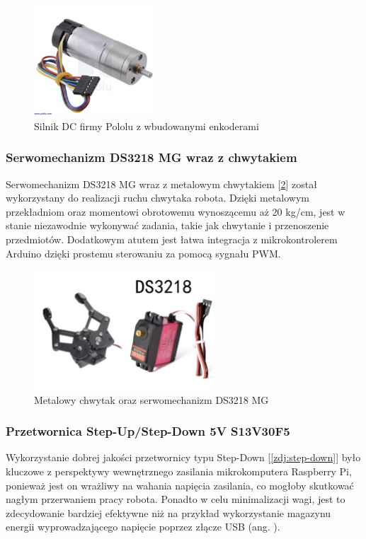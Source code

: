 \begin{figure}[H]
        \centering
        \includegraphics[width=0.4\textwidth]{./graf/silnik-pololu.png}
        \caption{Silnik DC firmy Pololu z wbudowanymi enkoderami}
        \label{zdj:silnik-pololu}
\end{figure}

\subsubsection*{Serwomechanizm DS3218 MG wraz z chwytakiem}
Serwomechanizm DS3218 MG wraz z metalowym chwytakiem [\ref{zdj:gripper}] został wykorzystany do realizacji ruchu chwytaka robota. Dzięki metalowym przekładniom oraz momentowi obrotowemu wynoszącemu aż 20 kg/cm, jest w stanie niezawodnie wykonywać zadania, takie jak chwytanie i przenoszenie przedmiotów. Dodatkowym atutem jest łatwa integracja z mikrokontrolerem Arduino dzięki prostemu sterowaniu za pomocą sygnału PWM. 


\begin{figure}[H]
        \centering
        \includegraphics[width=0.6\textwidth]{./graf/gripper.png}
        \caption{Metalowy chwytak oraz serwomechanizm DS3218 MG}
        \label{zdj:gripper}
\end{figure}

\subsubsection*{Przetwornica Step-Up/Step-Down 5V S13V30F5}
Wykorzystanie dobrej jakości przetwornicy typu Step-Down [\ref{zdj:step-down}] było kluczowe z perspektywy wewnętrznego zasilania mikrokomputera Raspberry Pi, ponieważ jest on wrażliwy na wahania napięcia zasilania, co mogłoby skutkować nagłym przerwaniem pracy robota. Ponadto w celu minimalizacji wagi, jest to zdecydowanie bardziej efektywne niż na przykład wykorzystanie magazynu energii wyprowadzającego napięcie poprzez złącze USB (ang. ). 


